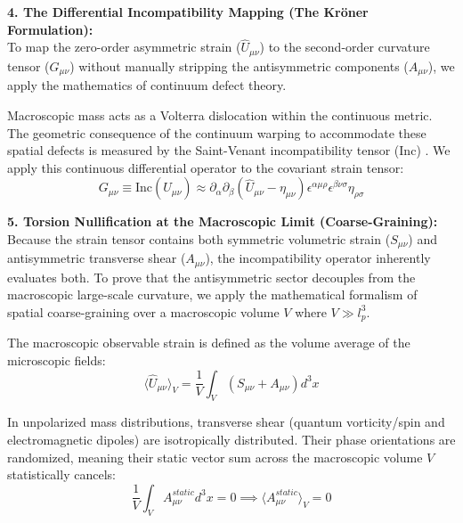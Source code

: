 \vspace{0.2 cm}

\textbf{4. The Differential Incompatibility Mapping (The Kr\"{o}ner Formulation):} \\
To map the zero-order asymmetric strain ($\hat{U}_{\mu\nu}$) to the second-order curvature tensor ($G_{\mu\nu}$) without manually stripping the antisymmetric components ($A_{\mu\nu}$), we apply the mathematics of continuum defect theory.

Macroscopic mass acts as a Volterra dislocation \cite{volterra1907equilibre} within the continuous metric. The geometric consequence of the continuum warping to accommodate these spatial defects is measured by the Saint-Venant incompatibility tensor ($\text{Inc}$) \cite{saint1864memoire,Landau1986}. We apply this continuous differential operator to the covariant strain tensor:
\begin{equation}
    G_{\mu\nu} \equiv \text{Inc}(\hat{U}_{\mu\nu}) \approx \partial_\alpha \partial_\beta (\hat{U}_{\mu\nu} - \eta_{\mu\nu}) \epsilon^{\alpha\mu\rho} \epsilon^{\beta\nu\sigma} \eta_{\rho\sigma} \label{eq:kroner_incompatibility}
\end{equation}

\textbf{5. Torsion Nullification at the Macroscopic Limit (Coarse-Graining):} \\
Because the strain tensor contains both symmetric volumetric strain ($S_{\mu\nu}$) and antisymmetric transverse shear ($A_{\mu\nu}$), the incompatibility operator inherently evaluates both. To prove that the antisymmetric sector decouples from the macroscopic large-scale curvature, we apply the mathematical formalism of spatial coarse-graining over a macroscopic volume $V$ where $V \gg l_p^3$.

The macroscopic observable strain is defined as the volume average of the microscopic fields:
\begin{equation}
    \langle \hat{U}_{\mu\nu} \rangle_V = \frac{1}{V} \int_V \left( S_{\mu\nu} + A_{\mu\nu} \right) d^3x
\end{equation}

In unpolarized mass distributions, transverse shear (quantum vorticity/spin and electromagnetic dipoles) are isotropically distributed. Their phase orientations are randomized, meaning their static vector sum across the macroscopic volume $V$ statistically cancels: 
\begin{equation}
    \frac{1}{V} \int_V A_{\mu\nu}^{static} d^3x = 0 \implies \langle A_{\mu\nu}^{static} \rangle_V = 0 
\end{equation}

